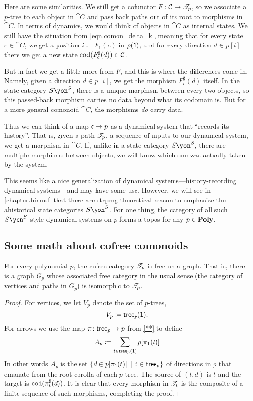 \documentclass[Book-Poly]{subfiles}
\begin{document}
Here are some similarities. We still get a cofunctor $F\colon\mathcal{C}\to\mathscr{T}_{p}$, so we associate a $p$-tree to each object in $\cat{C}$ and pass back paths out of its root to morphisms in $\cat{C}$. In terms of dynamics, we would think of objects in $\cat{C}$ as internal states. We still have the situation from \eqref{eqn.comon_delta_k}, meaning that for every state $c\in\cat{C}$, we get a position $i\coloneqq F_1(c)$ in $p(\textsf{1})$, and for every direction $d\in p[i]$ there we get a new state $\operatorname{cod}(F^\sharp_c(d))\in\mathcal{C}$. 

But in fact we get a little more from $F$, and this is where the differences come in. Namely, given a direction $d\in p[i]$, we get the morphism $F^\sharp_c(d)$ itself. In the state category $S\yon^S$, there is a unique morphism between every two objects, so this passed-back morphism carries no data beyond what its codomain is. But for a more general comonoid $\cat{C}$, the morphisms \emph{do} carry data. 

Thus we can think of a map $\mathfrak{c}\to p$ as a dynamical system that ``records its history''. That is, given a path $\mathscr{T}_{p}$, a sequence of inputs to our dynamical system, we get a morphism in $\cat{C}$. If, unlike in a state category $S\yon^S$, there are multiple morphisms between objects, we will know which one was actually taken by the system.

This seems like a nice generalization of dynamical systems---history-recording dynamical systems---and may have some use. However, we will see in \cref{chapter.bimod} that there are strpmg theoretical reason to emphasize the ahistorical state categories $S\yon^S$. For one thing, the category of all such $S\yon^S$-style dynamical systems on $p$ forms a topos for any $p\in\mathbf{Poly}$.


\subsection{Some math about cofree comonoids}

\begin{proposition}\label{prop.cofree_free_on_graph}
For every polynomial $p$, the cofree category $\mathscr{T}_{p}$ is free on a graph. That is, there is a graph $G_p$ whose associated free category in the usual sense (the category of vertices and paths in $G_p$) is isomorphic to $\mathscr{T}_{p}$.
\end{proposition}
\begin{proof}
For vertices, we let $V_p$ denote the set of $p$-trees,
\[V_p\coloneqq\mathsf{tree}_p(\textsf{1}).\]
For arrows we use the map $\pi\colon\mathsf{tree}_p\to p$ from \cref{**} to define
\[
A_p\coloneqq\sum_{t\in\mathsf{tree}_p(\textsf{1})}p[\pi_1(t)]
\]
In other words $A_p$ is the set $\{d\in p[\pi_1(t)]\,\mid\,t\in\mathsf{tree}_p\}$ of directions in $p$ that emanate from the root corolla of each $p$-tree. The source of $(t,d)$ is $t$ and the target is $\operatorname{cod}(\pi^\sharp_t(d))$. It is clear that every morphism in $\mathscr{T}_{t}$ is the composite of a finite sequence of such morphisms, completing the proof.
\end{proof}
\end{document}
